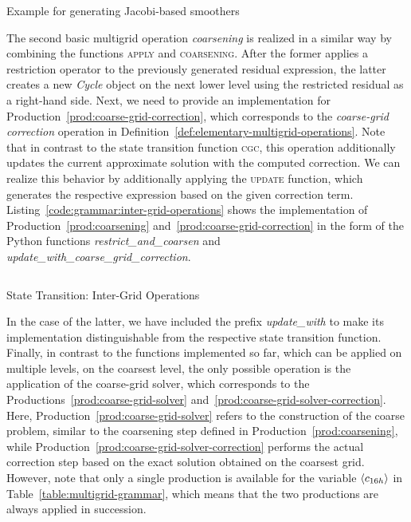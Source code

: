 \begin{listing}
	\inputminted{python}{evostencils/grammar/jacobi.py}
	\caption{Example for generating Jacobi-based smoothers}
	\label{code:grammar:jacobi}
\end{listing}
The second basic multigrid operation \emph{coarsening} is realized in a similar way by combining the functions \textsc{apply} and \textsc{coarsening}.
After the former applies a restriction operator to the previously generated residual expression, the latter creates a new \emph{Cycle} object on the next lower level using the restricted residual as a right-hand side.
Next, we need to provide an implementation for Production~\eqref{prod:coarse-grid-correction}, which corresponds to the \emph{coarse-grid correction} operation in Definition~\ref{def:elementary-multigrid-operations}.
Note that in contrast to the state transition function \textsc{cgc}, this operation additionally updates the current approximate solution with the computed correction.
We can realize this behavior by additionally applying the \textsc{update} function, which generates the respective expression based on the given correction term.
Listing~\ref{code:grammar:inter-grid-operations} shows the implementation of Production~\eqref{prod:coarsening} and~\ref{prod:coarse-grid-correction} in the form of the Python functions \emph{restrict\_and\_coarsen} and \emph{update\_with\_coarse\_grid\_correction}.
\begin{listing}
	\inputminted{python}{evostencils/grammar/inter_grid_operations.py}
	\caption{State Transition: Inter-Grid Operations}
	\label{code:grammar:inter-grid-operations}
\end{listing}
In the case of the latter, we have included the prefix \emph{update\_with} to make its implementation distinguishable from the respective state transition function.
Finally, in contrast to the functions implemented so far, which can be applied on multiple levels, on the coarsest level, the only possible operation is the application of the coarse-grid solver, which corresponds to the Productions~\eqref{prod:coarse-grid-solver} and~\eqref{prod:coarse-grid-solver-correction}.
Here, Production~\eqref{prod:coarse-grid-solver} refers to the construction of the coarse problem, similar to the coarsening step defined in Production~\eqref{prod:coarsening}, while Production~\eqref{prod:coarse-grid-solver-correction} performs the actual correction step based on the exact solution obtained on the coarsest grid. 
However, note that only a single production is available for the variable $\langle c_{16h} \rangle$ in Table~\ref{table:multigrid-grammar}, which means that the two productions are always applied in succession.
